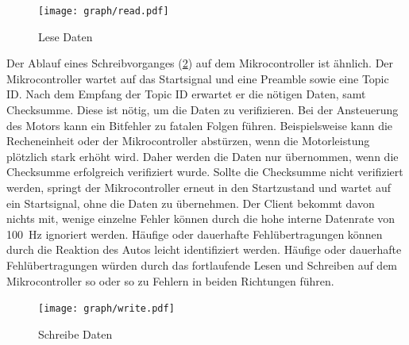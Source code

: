 \begin{figure}[ht]
\centering
\texttt{[image: graph/read.pdf]} 
\caption{Lese Daten}
\label{fig:uC_read}
\end{figure}

Der Ablauf eines Schreibvorganges (\cref{fig:uC_write}) auf dem Mikrocontroller ist ähnlich. Der Mikrocontroller wartet auf das Startsignal und eine Preamble sowie eine Topic ID.
Nach dem Empfang der Topic ID erwartet er die nötigen Daten, samt Checksumme. Diese ist nötig, um die Daten zu verifizieren. Bei der Ansteuerung des Motors kann ein
Bitfehler zu fatalen Folgen führen. Beispielsweise kann die Recheneinheit oder der Mikrocontroller abstürzen, wenn die Motorleistung plötzlich stark erhöht wird.
Daher werden die Daten nur übernommen, wenn die Checksumme erfolgreich verifiziert wurde. Sollte die Checksumme nicht verifiziert werden, springt der Mikrocontroller
erneut in den Startzustand und wartet auf ein Startsignal, ohne die Daten zu übernehmen. Der Client bekommt davon nichts mit, wenige einzelne Fehler können durch die
hohe interne Datenrate von \SI{100}{\hertz} ignoriert werden. Häufige oder dauerhafte Fehlübertragungen können durch die Reaktion des Autos leicht identifiziert werden.
Häufige oder dauerhafte Fehlübertragungen würden durch das fortlaufende Lesen und Schreiben auf dem Mikrocontroller so oder so zu Fehlern in beiden Richtungen führen.

\begin{figure}[ht]
\centering
\texttt{[image: graph/write.pdf]} 
\caption{Schreibe Daten}
\label{fig:uC_write}
\end{figure}





